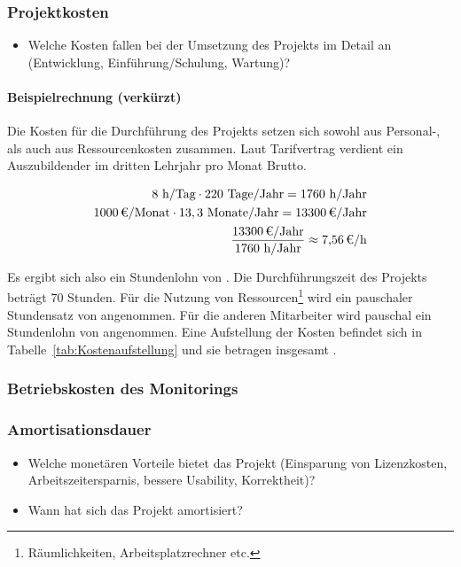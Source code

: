 \subsubsection{Projektkosten}
\label{sec:Projektkosten}
\begin{itemize}
	\item Welche Kosten fallen bei der Umsetzung des Projekts im Detail an (\zB Entwicklung, Einführung/Schulung, Wartung)?
\end{itemize}

\paragraph{Beispielrechnung (verkürzt)}
Die Kosten für die Durchführung des Projekts setzen sich sowohl aus Personal-, als auch aus Ressourcenkosten zusammen.
Laut Tarifvertrag verdient ein Auszubildender im dritten Lehrjahr pro Monat  Brutto. 

\begin{eqnarray}
8 \mbox{ h/Tag} \cdot 220 \mbox{ Tage/Jahr} = 1760 \mbox{ h/Jahr}\\
\eur{1000}\mbox{/Monat} \cdot 13,3 \mbox{ Monate/Jahr} = \eur{13300} \mbox{/Jahr}\\
\frac{\eur{13300} \mbox{/Jahr}}{1760 \mbox{ h/Jahr}} \approx \eur{7,56}\mbox{/h}
\end{eqnarray}

Es ergibt sich also ein Stundenlohn von . 
Die Durchführungszeit des Projekts beträgt 70 Stunden. Für die Nutzung von Ressourcen\footnote{Räumlichkeiten, Arbeitsplatzrechner etc.} wird 
ein pauschaler Stundensatz von  angenommen. Für die anderen Mitarbeiter wird pauschal ein Stundenlohn von  angenommen. 
Eine Aufstellung der Kosten befindet sich in Tabelle~\ref{tab:Kostenaufstellung} und sie betragen insgesamt .

\subsubsection{Betriebskosten des Monitorings}
\label{sec:BetriebskostenMonitoring}

\subsubsection{Amortisationsdauer}
\label{sec:Amortisationsdauer}
\begin{itemize}
	\item Welche monetären Vorteile bietet das Projekt (\zB Einsparung von Lizenzkosten, Arbeitszeitersparnis, bessere Usability, Korrektheit)?
	\item Wann hat sich das Projekt amortisiert?
\end{itemize}

